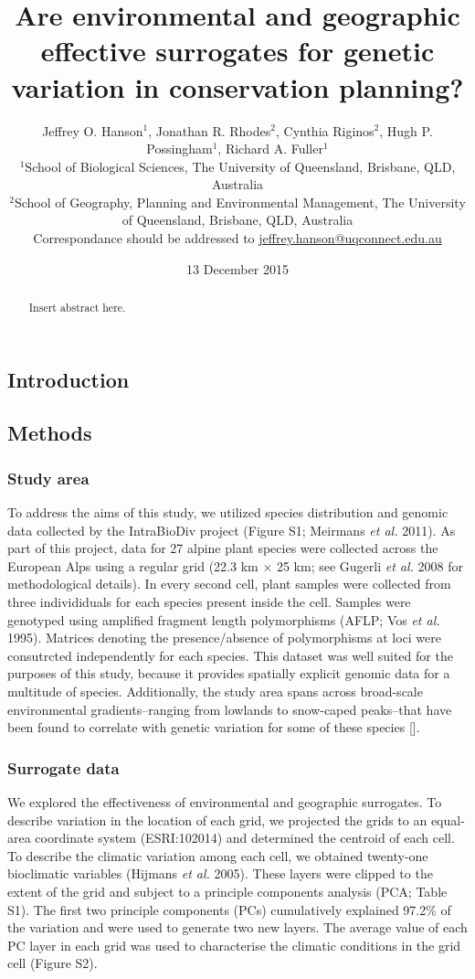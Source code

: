\documentclass[11pt,]{article}
\title{Are environmental and geographic effective surrogates for genetic
variation in conservation planning?}
\author{Jeffrey O. Hanson$^1$, Jonathan R. Rhodes$^2$, Cynthia Riginos$^2$, Hugh
P. Possingham$^1$, Richard A. Fuller$^1$\\$^1$School of Biological
Sciences, The University of Queensland, Brisbane, QLD,
Australia\\$^2$School of Geography, Planning and Environmental
Management, The University of Queensland, Brisbane, QLD,
Australia\\Correspondance should be addressed to
\href{mailto:jeffrey.hanson@uqconnect.edu.au}{jeffrey.hanson@uqconnect.edu.au}}
\date{13 December 2015}
\begin{document}
\maketitle

\begin{abstract}
Insert abstract here.
\end{abstract}

{
\hypersetup{linkcolor=black}
\setcounter{tocdepth}{5}
\tableofcontents
}
\subsection{Introduction}\label{introduction}

\subsection{Methods}\label{methods}

\subsubsection{Study area}\label{study-area}

To address the aims of this study, we utilized species distribution and
genomic data collected by the IntraBioDiv project (Figure S1; Meirmans
\emph{et al.} 2011). As part of this project, data for 27 alpine plant
species were collected across the European Alps using a regular grid
(22.3 km $\times$ 25 km; see Gugerli \emph{et al.} 2008 for
methodological details). In every second cell, plant samples were
collected from three individiduals for each species present inside the
cell. Samples were genotyped using amplified fragment length
polymorphisms (AFLP; Vos \emph{et al.} 1995). Matrices denoting the
presence/absence of polymorphisms at loci were consutrcted independently
for each species. This dataset was well suited for the purposes of this
study, because it provides spatially explicit genomic data for a
multitude of species. Additionally, the study area spans across
broad-scale environmental gradients--ranging from lowlands to snow-caped
peaks--that have been found to correlate with genetic variation for some
of these species {[}{]}.

\subsubsection{Surrogate data}\label{surrogate-data}

We explored the effectiveness of environmental and geographic
surrogates. To describe variation in the location of each grid, we
projected the grids to an equal-area coordinate system (ESRI:102014) and
determined the centroid of each cell. To describe the climatic variation
among each cell, we obtained twenty-one bioclimatic variables (Hijmans
\emph{et al.} 2005). These layers were clipped to the extent of the grid
and subject to a principle components analysis (PCA; Table S1). The
first two principle components (PCs) cumulatively explained 97.2\% of
the variation and were used to generate two new layers. The average
value of each PC layer in each grid was used to characterise the
climatic conditions in the grid cell (Figure S2).
\end{document}
